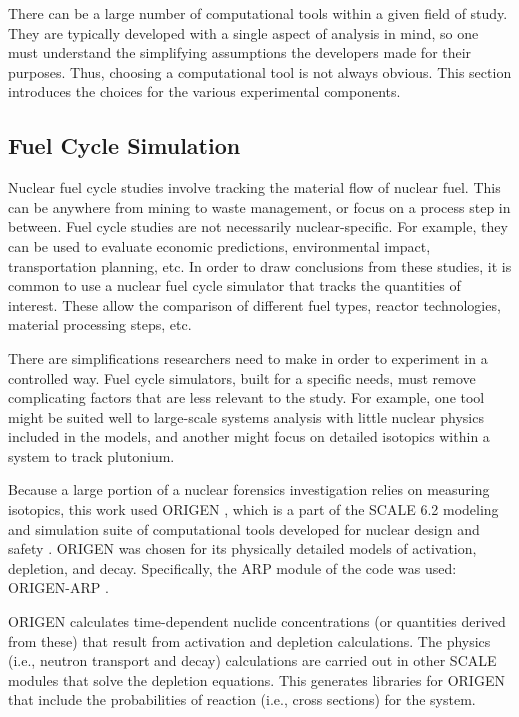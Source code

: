 There can be a large number of computational tools within a given field of
study.  They are typically developed with a single aspect of analysis in mind,
so one must understand the simplifying assumptions the developers made for
their purposes. Thus, choosing a computational tool is not always obvious. This
section introduces the choices for the various experimental components.

\subsection{Fuel Cycle Simulation}

Nuclear fuel cycle studies involve tracking the material flow of nuclear fuel.
This can be anywhere from mining to waste management, or focus on a process
step in between. Fuel cycle studies are not necessarily nuclear-specific. For
example, they can be used to evaluate economic predictions, environmental
impact, transportation planning, etc.  In order to draw conclusions from these
studies, it is common to use a nuclear fuel cycle simulator that tracks the
quantities of interest. These allow the comparison of different fuel types,
reactor technologies, material processing steps, etc. 

There are simplifications researchers need to make in order to experiment in a
controlled way. Fuel cycle simulators, built for a specific needs, must remove
complicating factors that are less relevant to the study.  For example, one
tool might be suited well to large-scale systems analysis with little nuclear
physics included in the models, and another might focus on detailed isotopics
within a system to track plutonium.

Because a large portion of a nuclear forensics investigation relies on
measuring isotopics, this work used \gls{ORIGEN} \cite{origen}, which is a part
of the \gls{SCALE} 6.2 modeling and simulation suite of computational tools
developed for nuclear design and safety \cite{scale}. \gls{ORIGEN} was chosen
for its physically detailed models of activation, depletion, and decay.
Specifically, the ARP module of the code was used: \gls{ORIGEN-ARP} \cite{origenarp}.

\gls{ORIGEN} calculates time-dependent nuclide concentrations (or quantities
derived from these) that result from activation and depletion calculations. The
physics (i.e., neutron transport and decay) calculations are carried out in
other \gls{SCALE} modules that solve the depletion equations.  This generates
libraries for \gls{ORIGEN} that include the probabilities of reaction (i.e.,
cross sections) for the system.

